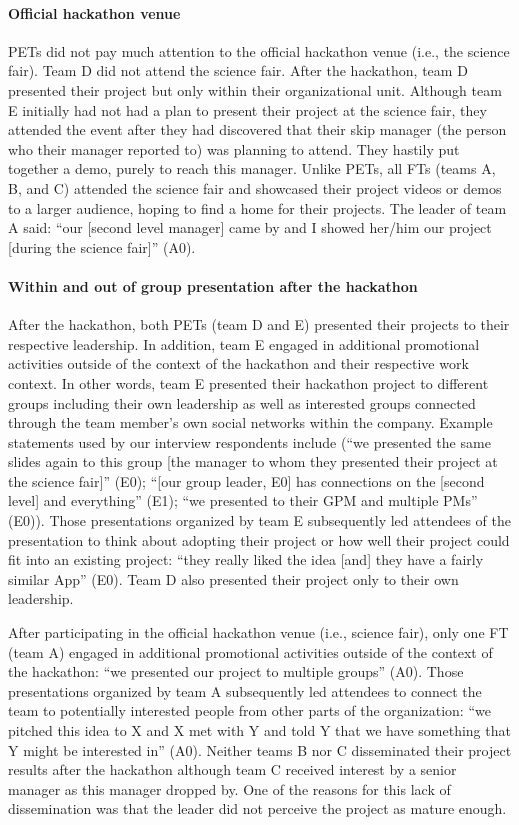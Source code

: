 \documentclass{hcij}
\begin{document}
\paragraph{Official hackathon venue}
PETs did not pay much attention to the official hackathon venue (i.e., the science fair). Team D did not attend the science fair. After the hackathon, team D presented their project but only within their organizational unit. Although team E initially had not had a plan to present their project at the science fair, they attended the event after they had discovered that their skip manager (the person who their manager reported to) was planning to attend. They hastily put together a demo, purely to reach this manager.
Unlike PETs, all FTs (teams A, B, and C) attended the science fair and showcased their project videos or demos to a larger audience, hoping to find a home for their projects. The leader of team A said: “our [second level manager] came by and I showed her/him our project [during the science fair]” (A0).

\paragraph{Within and out of group presentation after the hackathon}
After the hackathon, both PETs (team D and E) presented their projects to their respective leadership. In addition, team E engaged in additional promotional activities outside of the context of the hackathon and their respective work context. In other words, team E presented their hackathon project to different groups including their own leadership as well as interested groups connected through the team member’s own social networks within the company. Example statements used by our interview respondents include (“we presented the same slides again to this group [the manager to whom they presented their project at the science fair]” (E0); “[our group leader, E0] has connections on the [second level] and everything” (E1); “we presented to their GPM and multiple PMs” (E0)). Those presentations organized by team E subsequently led attendees of the presentation to think about adopting their project or how well their project could fit into an existing project: “they really liked the idea [and] they have a fairly similar App” (E0). Team D also presented their project only to their own leadership.

After participating in the official hackathon venue (i.e., science fair), only one FT (team A) engaged in additional promotional activities outside of the context of the hackathon: “we presented our project to multiple groups” (A0). Those presentations organized by team A subsequently led attendees to connect the team to potentially interested people from other parts of the organization:  “we pitched this idea to X and X met with Y and told Y that we have something that Y might be interested in” (A0). Neither teams B nor C disseminated their project results after the hackathon although team C received interest by a senior manager as this manager dropped by.  One of the reasons for this lack of dissemination was that the leader did not perceive the project as mature enough.
\end{document}
